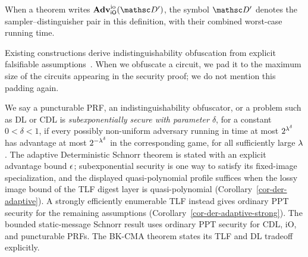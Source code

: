 When a theorem writes $\AdvIO{\iO}{\advD'}$, the symbol $\advD'$ denotes the sampler--distinguisher pair in this definition, with their combined worst-case running time.

Existing constructions derive indistinguishability obfuscation from explicit falsifiable assumptions~\cite{STOC:JaiLinSah21,EC:JaiLinSah22}. When we obfuscate a circuit, we pad it to the maximum size of the circuits appearing in the security proof; we do not mention this padding again.

 We say a puncturable PRF, an indistinguishability obfuscator, or a problem such as DL or CDL is \emph{subexponentially secure with parameter $\delta$}, for a constant $0 < \delta < 1$, if every possibly non-uniform adversary running in time at most $2^{\lambda^{\delta}}$ has advantage at most $2^{-\lambda^{\delta}}$ in the corresponding game, for all sufficiently large $\lambda$. The adaptive Deterministic Schnorr theorem is stated with an explicit advantage bound $\epsilon$; subexponential security is one way to satisfy its fixed-image specialization, and the displayed quasi-polynomial profile suffices when the lossy image bound of the TLF digest layer is quasi-polynomial (Corollary~\ref{cor-der-adaptive}). A strongly efficiently enumerable TLF instead gives ordinary PPT security for the remaining assumptions (Corollary~\ref{cor-der-adaptive-strong}). The bounded static-message Schnorr result uses ordinary PPT security for CDL, iO, and puncturable PRFs. The BK-CMA theorem states its TLF and DL tradeoff explicitly.
